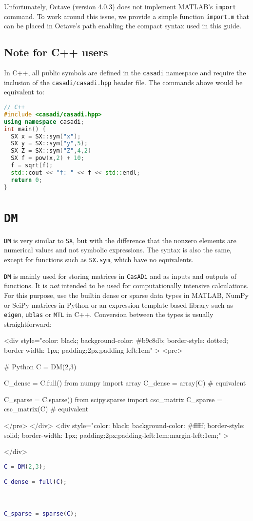 \documentclass[a4paper,12pt]{book}
\newcommand{\CasADi}{\texttt{CasADi}\xspace}
\newcounter{pytexcount}
\newcounter{pytexsubcount}
\renewenvironment{pytex}
{\addtocounter{pytexsubcount}{1}%
\begin{rawhtml}
<div style="color: black; background-color: \#b9c8db;  border-style: dotted; border-width: 1px; padding:2px;padding-left:1em" >
<pre>
\end{rawhtml}
}%
{\begin{rawhtml}
</pre>
</div>
<div style="color: black; background-color: \#fffff;  border-style: solid; border-width: 1px; padding:2px;padding-left:1em;margin-left:1em;" >\end{rawhtml}%
\verbatiminputeval{pytex_\alph{pytexcount}_\arabic{pytexsubcount}.log}%
\begin{rawhtml}
</div>
\end{rawhtml}
}
\begin{document}
Unfortunately, Octave (version 4.0.3) does not implement MATLAB's \texttt{import} command. To work around this issue, we provide a simple
function \texttt{import.m} that can be placed in Octave's path enabling the compact syntax used in this guide.

\subsection*{Note for C++ users}
In C++, all public symbols are defined in the \texttt{casadi} namespace and require the inclusion of the \lstinline[language=C++]{casadi/casadi.hpp} header file.
The commands above would be equivalent to:
\begin{lstlisting}[language=C++]
// C++
#include <casadi/casadi.hpp>
using namespace casadi;
int main() {
  SX x = SX::sym("x");
  SX y = SX::sym("y",5);
  SX Z = SX::sym("Z",4,2)
  SX f = pow(x,2) + 10;
  f = sqrt(f);
  std::cout << "f: " << f << std::endl;
  return 0;
}
\end{lstlisting}

\section{\texttt{DM}}
\texttt{DM} is very similar to \texttt{SX}, but with the difference that the nonzero elements are numerical values and not symbolic expressions. The syntax is also the same, except for functions such as \texttt{SX.sym}, which have no equivalents.

\texttt{DM} is mainly used for storing matrices in \CasADi and as inputs and outputs of functions. It is \emph{not} intended to be used for computationally intensive calculations. For this purpose, use the builtin dense or sparse data types in MATLAB, NumPy or SciPy matrices in Python or an expression template based library such as \texttt{eigen}, \texttt{ublas} or \texttt{MTL} in C++. Conversion between the types is usually straightforward:

\begin{minipage}[t]{0.5\textwidth}
\begin{pytex}
# Python
C = DM(2,3)

C_dense = C.full()
from numpy import array
C_dense = array(C) # equivalent

C_sparse = C.sparse()
from scipy.sparse import csc_matrix
C_sparse = csc_matrix(C) # equivalent
\end{pytex}
\end{minipage}
\begin{minipage}[t]{0.5\textwidth}
  \begin{lstlisting}[language=Matlab]
% MATLAB/Octave
C = DM(2,3);

C_dense = full(C);



C_sparse = sparse(C);


  \end{lstlisting}
\end{minipage}
\end{document}
